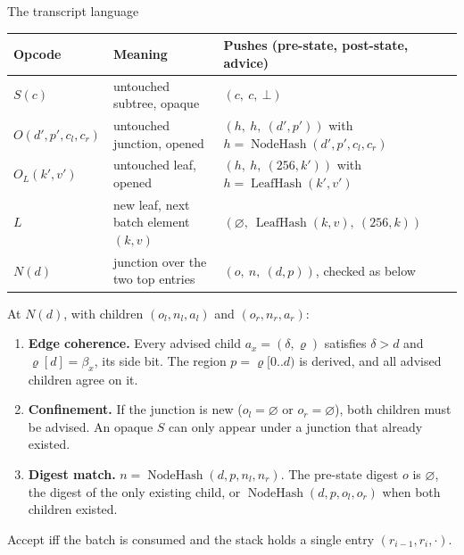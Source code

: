\documentclass[aspectratio=169,10pt]{beamer}
\newcommand{\LeafHash}{\operatorname{LeafHash}}
\newcommand{\NodeHash}{\operatorname{NodeHash}}
\begin{document}
\begin{frame}{The transcript language}
\footnotesize
\begin{tabular}{@{}l l l@{}}
\toprule
Opcode & Meaning & Pushes (pre-state, post-state, advice) \\
\midrule
$S(c)$ & untouched subtree, opaque & $(c,\ c,\ \bot)$ \\
$O(d',p',c_l,c_r)$ & untouched junction, opened & $(h,\ h,\ (d',p'))$ with $h = \NodeHash(d',p',c_l,c_r)$ \\
$O_L(k',v')$ & untouched leaf, opened & $(h,\ h,\ (256,k'))$ with $h = \LeafHash(k',v')$ \\
$L$ & new leaf, next batch element $(k,v)$ & $(\varnothing,\ \LeafHash(k,v),\ (256,k))$ \\
$N(d)$ & junction over the two top entries & $(o,\ n,\ (d,p))$, checked as below \\
\bottomrule
\end{tabular}

\vspace{2mm}
\small
At $N(d)$, with children $(o_l, n_l, a_l)$ and $(o_r, n_r, a_r)$:
\begin{enumerate}
  \item \textbf{Edge coherence.} Every advised child $a_x = (\delta, \varrho)$ satisfies $\delta > d$ and $\varrho[d] = \beta_x$, its side bit. The region $p = \varrho[0..d)$ is derived, and all advised children agree on it.
  \item \textbf{Confinement.} If the junction is new ($o_l = \varnothing$ or $o_r = \varnothing$), both children must be advised. An opaque $S$ can only appear under a junction that already existed.
  \item \textbf{Digest match.} $n = \NodeHash(d,p,n_l,n_r)$. The pre-state digest $o$ is $\varnothing$, the digest of the only existing child, or $\NodeHash(d,p,o_l,o_r)$ when both children existed.
\end{enumerate}
Accept iff the batch is consumed and the stack holds a single entry $(r_{i-1}, r_i, \cdot)$.
\end{frame}
\end{document}
